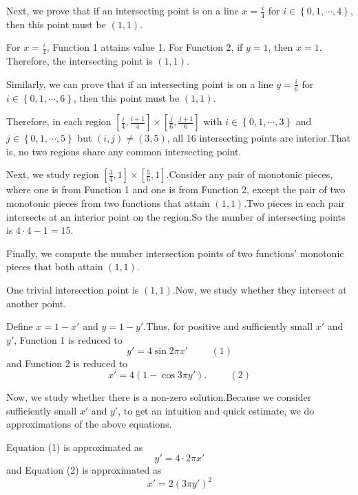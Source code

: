 \begin{enumerate}
 Next, we prove that if an intersecting point is on a line $x = \frac{i}{4}$ for $i \in \left\{ 0, 1, \cdots, 4 \right\}$, then this point must be $\left( 1, 1 \right)$.

 For $x = \frac{i}{4}$, Function 1 attains value 1. For Function 2, if $y = 1$, then $x = 1$. Therefore, the intersecting point is $\left( 1, 1 \right)$.

 Similarly, we can prove that if an intersecting point is on a line $y = \frac{i}{6}$ for $i \in \left\{ 0, 1, \cdots, 6 \right\}$, then this point must be $\left( 1, 1 \right)$.

 Therefore, in each region $\left[ \frac{i}{4} , \frac{i+1}{4} \right] \times \left[ \frac{j}{6} , \frac{j+1}{6} \right]$ with $i \in \left\{ 0, 1, \cdots, 3 \right\}$ and $j \in \left\{0, 1, \cdots , 5 \right\}$ but $\left( i, j \right) \neq \left( 3, 5 \right)$, all 16 intersecting points are interior.That is, no two regions share any common intersecting point.

 Next, we study region  $\left[ \frac{3}{4} , 1 \right] \times \left[ \frac{5}{6} , 1 \right]$.Consider any pair of monotonic pieces, where one is from Function 1 and one is from Function 2, except the pair of two monotonic pieces from two functions that attain $\left( 1 , 1 \right)$.Two pieces in each pair intersects at an interior point on the region.So the number of intersecting points is $4 \cdot 4 - 1 = 15$.

 Finally, we compute the number intersection points of two functions' monotonic pieces that both attain $\left( 1, 1 \right)$.

 One trivial intersection point is $\left( 1, 1 \right)$.Now, we study whether they intersect at another point.

 Define $x = 1 - x'$ and $y = 1 - y'$.Thus, for positive and sufficiently small $x'$ and $y'$, Function 1 is reduced to
 \[ y' = 4 \sin 2 \pi x' \hspace{1cm} (1) \]and Function 2 is reduced to
 \[ x' = 4 \left( 1 - \cos 3 \pi y' \right) . \hspace{1cm} (2) \]

 Now, we study whether there is a non-zero solution.Because we consider sufficiently small $x'$ and $y'$, to get an intuition and quick estimate, we do approximations of the above equations.

 Equation (1) is approximated as
 \[ y' = 4 \cdot 2 \pi x' \]and Equation (2) is approximated as
 \[ x' = 2 \left( 3 \pi y' \right)^2  \]


\end{enumerate}
